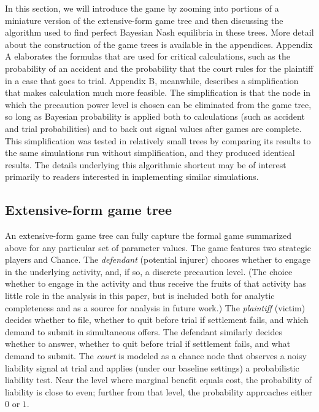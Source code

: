 \documentclass{article}
\begin{document}
In this section, we will introduce the game by zooming into portions of a miniature version of the extensive-form game tree and then discussing the algorithm used to find perfect Bayesian Nash equilibria in these trees. More detail about the construction of the game trees is available in the appendices. Appendix A elaborates the formulas that are used for critical calculations, such as the probability of an accident and the probability that the court rules for the plaintiff in a case that goes to trial. Appendix B, meanwhile, describes a simplification that makes calculation much more feasible. The simplification is that the node in which the precaution power level is chosen can be eliminated from the game tree, so long as Bayesian probability is applied both to calculations (such as accident and trial probabilities) and to back out signal values after games are complete. This simplification was tested in relatively small trees by comparing its results to the same simulations run without simplification, and they produced identical results. The details underlying this algorithmic shortcut may be of interest primarily to readers interested in implementing similar simulations.

\subsection{Extensive-form game tree}

An extensive-form game tree can fully capture the formal game summarized above for any particular set of parameter values. The game features two strategic players and Chance. The \emph{defendant} (potential injurer) chooses whether to engage in the underlying activity, and, if so, a discrete precaution level. (The choice whether to engage in the activity and thus receive the fruits of that activity has little role in the analysis in this paper, but is included both for analytic completeness and as a source for analysis in future work.) The \emph{plaintiff} (victim) decides whether to file, whether to quit before trial if settlement fails, and which demand to submit in simultaneous offers. The defendant similarly decides whether to answer, whether to quit before trial if settlement fails, and what demand to submit. The \emph{court} is modeled as a chance node that observes a noisy liability signal at trial and applies (under our baseline settings) a probabilistic liability test. Near the level where marginal benefit equals cost, the probability of liability is close to even; further from that level, the probability approaches either $0$ or $1$. 
\end{document}
